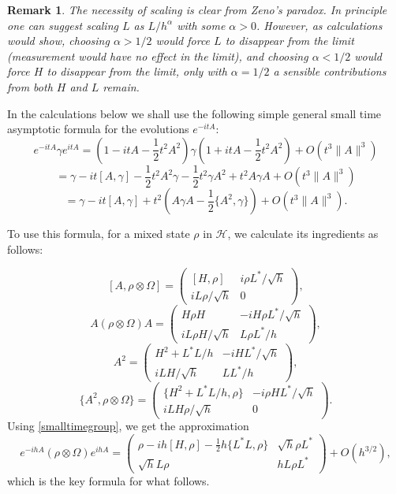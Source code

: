 \documentclass[12pt]{article}
\def\HC{\mathcal{H}}
\def\al{\alpha}
\def\ga{\gamma}
\newtheorem{remark}{Remark}
\newcommand{\Om}{\Omega}
\begin{document}
 \begin{remark}
 The necessity of scaling is clear from Zeno's paradox. In principle one can suggest
 scaling $L$ as $L/h^{\al}$ with some $\al>0$. However, as calculations would show, choosing $\al>1/2$ would force $L$
 to disappear from the limit (measurement would have no effect in the limit), and choosing $\al<1/2$
 would force $H$ to disappear from the limit,
  only with $\al=1/2$ a sensible contributions from both $H$ and $L$ remain.
 \end{remark}


In the calculations below we shall use the following simple general small time asymptotic
formula for the evolutions $e^{-itA}$:
\[
e^{-itA}\ga e^{itA}
=(1-it A -\frac12 t^2 A^2)\ga (1+it A-\frac12 t^2 A^2)+O(t^3 \|A\|^3)
\]
\[
=\ga-it [A,\ga]-\frac12 t^2 A^2\ga -\frac12 t^2 \ga A^2+t^2 A\ga A+O(t^3 \|A\|^3)
\]
\begin{equation}
\label{smalltimegroup}
=\ga-it [A,\ga]+t^2 (A\ga A-\frac12 \{A^2,\ga\})+O(t^3\|A\|^3).
\end{equation}

To use this formula, for a mixed state $\rho$ in $\HC$, we calculate its ingredients as follows:

\[
\left[A, \rho \otimes \Om \right]
=\begin{pmatrix} [H,\rho] & i\rho L^*/\sqrt h \\ iL\rho/\sqrt h & 0 \end{pmatrix},
\]
\[
A (\rho \otimes \Om) A
=\begin{pmatrix} H\rho H & -i H\rho L^*/\sqrt h\\ iL\rho H/\sqrt h & L\rho L^*/h \end{pmatrix},
\]
\[
A^2 =\begin{pmatrix} H^2+L^*L/h & -iH L^* /\sqrt h \\ iL H/\sqrt h & LL^*/h \end{pmatrix},
\]
\[
\{A^2, \rho \otimes \Om\}=\begin{pmatrix} \{H^2+L^*L/h,\rho\} & -i\rho H L^*/\sqrt h \\ iL H \rho/\sqrt h  & 0 \end{pmatrix}.
\]
Using \eqref{smalltimegroup},
we get the approximation
\begin{equation}
\label{eqdressedrho1}
e^{-ihA} (\rho\otimes \Om) e^{ihA}
=\begin{pmatrix} \rho -ih[H, \rho] -\frac12 h\{L^*L,\rho\} &  \sqrt h \rho L^* \\ \sqrt h L\rho & hL\rho L^* \end{pmatrix}
+O(h^{3/2}),
\end{equation}
which is the key formula for what follows.
\end{document}
